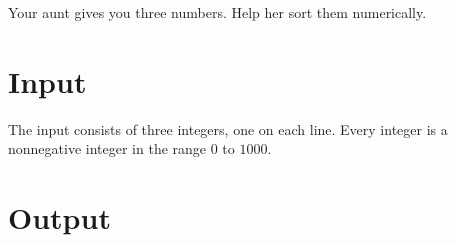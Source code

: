 
Your aunt gives you three numbers.
Help her sort them numerically.

\section*{Input}

The input consists of three integers, one on each line.
Every integer is a nonnegative integer in the range $0$ to $1000$.

\section*{Output}
